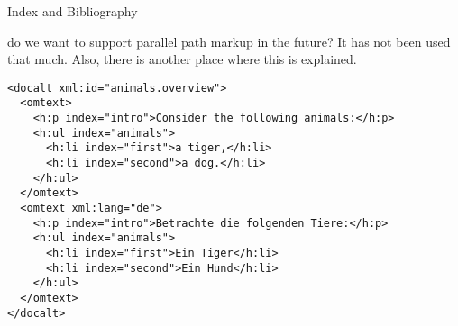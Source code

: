 \begin{module}[id=mtext]
\begin{omgroup}[id=mtext,short=Mathematical Text]
\begin{omgroup}[id=rt]{Index and Bibliography}
\begin{oldpart}{do we want to support parallel path markup in the future? It has not been
    used that much. Also, there is another place where this is explained.}
\begin{lstlisting}[label=lst:parallel-multiling,caption={Multilingual Parallel Markup},index={omtext,docalt,h:ul,h:li,h:p}]
<docalt xml:id="animals.overview">
  <omtext>
    <h:p index="intro">Consider the following animals:</h:p>
    <h:ul index="animals">
      <h:li index="first">a tiger,</h:li>
      <h:li index="second">a dog.</h:li>
    </h:ul>
  </omtext>
  <omtext xml:lang="de">
    <h:p index="intro">Betrachte die folgenden Tiere:</h:p>
    <h:ul index="animals">
      <h:li index="first">Ein Tiger</h:li>
      <h:li index="second">Ein Hund</h:li>
    </h:ul>
  </omtext>
</docalt>
\end{lstlisting}
\end{oldpart}
\end{omgroup}
\end{omgroup}
\end{module}


